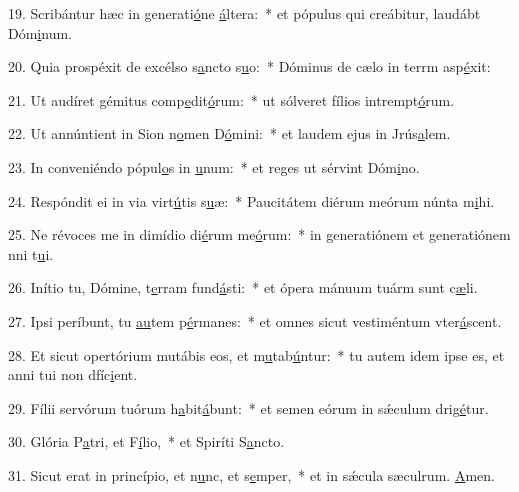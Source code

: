 19. Scribántur hæc in generati\uline{ó}ne \uline{á}ltera:~* et pópulus qui creábitur, laudábt Dóm\uline{i}num.\par 
20. Quia prospéxit de excélso s\uline{a}ncto s\uline{u}o:~* Dóminus de cælo in terrm asp\uline{é}xit:\par 
21. Ut audíret gémitus comp\uline{e}dit\uline{ó}rum:~* ut sólveret fílios intrempt\uline{ó}rum.\par 
22. Ut annúntient in Sion n\uline{o}men D\uline{ó}mini:~* et laudem ejus in Jrús\uline{a}lem.\par 
23. In conveniéndo pópul\uline{o}s in \uline{u}num:~* et reges ut sérvint Dóm\uline{i}no.\par 
24. Respóndit ei in via virt\uline{ú}tis s\uline{u}æ:~* Paucitátem diérum meórum núnta m\uline{i}hi.\par 
25. Ne révoces me in dimídio di\uline{é}rum me\uline{ó}rum:~* in generatiónem et generatiónem nni t\uline{u}i.\par 
26. Inítio tu, Dómine, t\uline{e}rram fund\uline{á}sti:~* et ópera mánuum tuárm sunt c\uline{æ}li.\par 
27. Ipsi períbunt, tu \uline{au}tem p\uline{é}rmanes:~* et omnes sicut vestiméntum vter\uline{á}scent.\par 
28. Et sicut opertórium mutábis eos, et m\uline{u}tab\uline{ú}ntur:~* tu autem idem ipse es, et anni tui non dfíc\uline{i}ent.\par 
29. Fílii servórum tuórum h\uline{a}bit\uline{á}bunt:~* et semen eórum in sǽculum drig\uline{é}tur.\par 
30. Glória P\uline{a}tri, et F\uline{í}lio,~* et Spiríti S\uline{a}ncto.\par 
31. Sicut erat in princípio, et n\uline{u}nc, et s\uline{e}mper,~* et in sǽcula sæculrum. \uline{A}men.\par 
